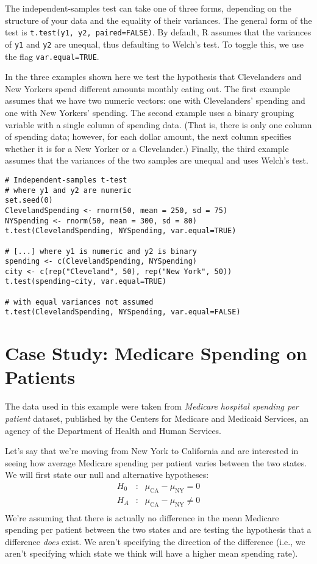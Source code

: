 The independent-samples test can take one of three forms, depending on the structure of your data and the equality of their variances. The general form of the test is \verb|t.test(y1, y2, paired=FALSE)|. By default, R assumes that the variances of \verb|y1| and \verb|y2| are unequal, thus defaulting to Welch's test. To toggle this, we use the flag \verb|var.equal=TRUE|.

In the three examples shown here we test the hypothesis that Clevelanders and New Yorkers spend different amounts monthly eating out. The first example assumes that we have two numeric vectors: one with Clevelanders' spending and one with New Yorkers' spending. The second example uses a binary grouping variable with a single column of spending data. (That is, there is only one column of spending data; however, for each dollar amount, the next column specifies whether it is for a New Yorker or a Clevelander.) Finally, the third example assumes that the variances of the two samples are unequal and uses Welch's test.
\begin{framed}
\begin{Verbatim}[samepage=TRUE]
# Independent-samples t-test
# where y1 and y2 are numeric
set.seed(0)
ClevelandSpending <- rnorm(50, mean = 250, sd = 75)
NYSpending <- rnorm(50, mean = 300, sd = 80)
t.test(ClevelandSpending, NYSpending, var.equal=TRUE)

# [...] where y1 is numeric and y2 is binary
spending <- c(ClevelandSpending, NYSpending)
city <- c(rep("Cleveland", 50), rep("New York", 50))
t.test(spending~city, var.equal=TRUE)

# with equal variances not assumed
t.test(ClevelandSpending, NYSpending, var.equal=FALSE)
\end{Verbatim}
\end{framed}

\section{Case Study: Medicare Spending on Patients}
The data used in this example were taken from \textit{Medicare hospital spending per patient} dataset, published by the Centers for Medicare and Medicaid Services, an agency of the Department of Health and Human Services.

Let's say that we're moving from New York to California and are interested in seeing how average Medicare spending per patient varies between the two states. We will first state our null and alternative hypotheses:
\begin{eqnarray*}
H_0&:&\mu_{\text{CA}}-\mu_{\text{NY}}=0 \\
H_A&:&\mu_{\text{CA}}- \mu_{\text{NY}}\neq 0 \\
\end{eqnarray*}
We're assuming that there is actually no difference in the mean Medicare spending per patient between the two states and are testing the hypothesis that a difference \textit{does} exist. We aren't specifying the direction of the difference (i.e., we aren't specifying which state we think will have a higher mean spending rate).

